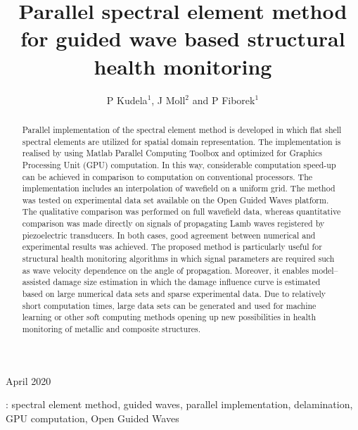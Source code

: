 \documentclass[12pt]{iopart}
\begin{document}
\title[Parallel spectral element method for SHM]{Parallel spectral element method for guided wave based structural health monitoring}

\author{P Kudela\(^1\), J Moll\(^2\) and P Fiborek\(^1\)}

\address{\(^1\)Institute of Fluid Flow Machinery, Polish Academy of Sciences, Poland}
\address{\(^2\)J.W. Goethe--University, Department of Physics, 60438 Frankfurt, Germany}

\vspace{10pt}
\begin{indented}
\item[] April 2020
\end{indented}

\begin{abstract}
Parallel implementation of the spectral element method is developed in which flat shell spectral elements are utilized for spatial domain representation. The implementation is realised by using Matlab Parallel Computing Toolbox and optimized for Graphics Processing Unit (GPU) computation. In this way, considerable computation speed-up can be achieved in comparison to computation on conventional processors. The implementation includes an interpolation of wavefield on a uniform grid. The method was tested on experimental data set available on the Open Guided Waves platform. The qualitative comparison was performed on full wavefield data, whereas quantitative comparison was made directly on signals of propagating Lamb waves registered by piezoelectric transducers. In both cases, good agreement between numerical and experimental results was achieved. The proposed method is particularly useful for structural health monitoring algorithms in which signal parameters are required such as wave velocity dependence on the angle of propagation. Moreover, it enables model--assisted damage size estimation in which the damage influence curve is estimated based on large numerical data sets and sparse experimental data. Due to relatively short computation times, large data sets can be generated and used for machine learning or other soft computing methods opening up new possibilities in health monitoring of metallic and composite structures.
\end{abstract}

%
\vspace{2pc}
: spectral element method, guided waves, parallel implementation, delamination, GPU computation, Open Guided Waves\\
\end{document}
